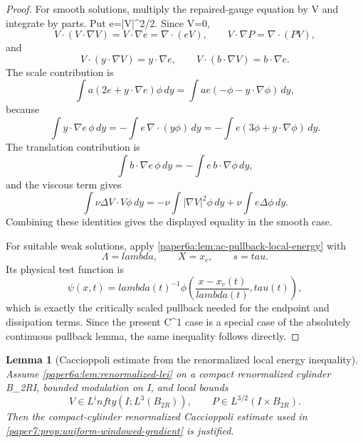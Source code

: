 \documentclass[11pt]{amsart}
\def\({}%
\def\){}%
\def\tau{tau}%
\def\lambda{lambda}%
\def\infty{infty}%
\theoremstyle{plain}
\newtheorem{lemma}[lemma]{Lemma}
\theoremstyle{definition}
\theoremstyle{remark}
\begin{document}
\begin{proof}
For smooth solutions, multiply the repaired-gauge equation by \(V\phi\) and
integrate by parts.  Put \(e=|V|^2/2\).  Since \(\nabla\cdot V=0\),
\[
  V\cdot(V\cdot\nabla V)=V\cdot\nabla e=\nabla\cdot(eV),
  \qquad
  V\cdot\nabla P=\nabla\cdot(PV),
\]
and
\[
  V\cdot(y\cdot\nabla V)=y\cdot\nabla e,
  \qquad
  V\cdot(b\cdot\nabla V)=b\cdot\nabla e .
\]
The scale contribution is
\[
  \int a(2e+y\cdot\nabla e)\phi\,dy
  =
  \int ae(-\phi-y\cdot\nabla\phi)\,dy,
\]
because
\[
  \int y\cdot\nabla e\,\phi\,dy
  =
  -\int e\,\nabla\cdot(y\phi)\,dy
  =
  -\int e(3\phi+y\cdot\nabla\phi)\,dy .
\]
The translation contribution is
\[
  \int b\cdot\nabla e\,\phi\,dy
  =
  -\int e\,b\cdot\nabla\phi\,dy,
\]
and the viscous term gives
\[
  \int \nu\Delta V\cdot V\phi\,dy
  =
  -\nu\int|\nabla V|^2\phi\,dy
  +\nu\int e\Delta\phi\,dy .
\]
Combining these identities gives the displayed equality in the smooth case.

For suitable weak solutions, apply
\cref{paper6a:lem:ac-pullback-local-energy} with
\[
  \Lambda=\lambda,\qquad X=x_c,\qquad s=\tau.
\]
Its physical test function is
\[
  \psi(x,t)=
  \lambda(t)^{-1}
  \phi\left(\frac{x-x_c(t)}{\lambda(t)},\tau(t)\right),
\]
which is exactly the critically scaled pullback needed for the endpoint and
dissipation terms.  Since the present \(C^1\) case is a special case of the
absolutely continuous pullback lemma, the same inequality follows directly.
\end{proof}

\begin{lemma}[Caccioppoli estimate from the renormalized local energy inequality]
\label{paper6a:lem:caccioppoli-from-renormalized-lei}
Assume \cref{paper6a:lem:renormalized-lei} on a compact renormalized cylinder
\(B_{2R}\times I\), bounded modulation on \(I\), and local bounds
\[
  V\in L^\infty(I;L^3(B_{2R})),
  \qquad
  P\in L^{3/2}(I\times B_{2R}).
\]
Then the compact-cylinder renormalized Caccioppoli estimate used in
\cref{paper7:prop:uniform-windowed-gradient} is justified.
\end{lemma}
\end{document}
